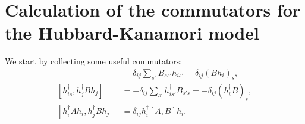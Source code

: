 \documentclass[11pt, a4paper]{article}
\begin{document}
\newpage
\appendix
\renewcommand{\theequation}{A\arabic{equation}}
\setcounter{equation}{0}

\section{Calculation of the commutators for the Hubbard-Kanamori model}

We start by collecting some useful commutators:
\begin{align}
[h_{is}, h_j^{\dagger} B h_j] &= \delta_{ij} \sum_{s'} B_{ss'} h_{is'} = \delta_{ij} (B h_i)_s, \label{eq:A1} \\
[h_{is}^{\dagger}, h_j^{\dagger} B h_j] &= -\delta_{ij} \sum_{s'} h_{is'}^{\dagger} B_{s's} = -\delta_{ij} (h_i^{\dagger} B)_s, \label{eq:A2} \\
[h_i^{\dagger} A h_i, h_j^{\dagger} B h_j] &= \delta_{ij} h_i^{\dagger} [A, B] h_i. \label{eq:A3}
\end{align}
\end{document}
